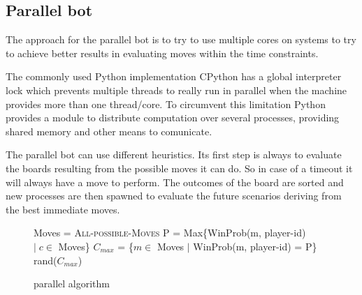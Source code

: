 \subsection{Parallel bot}
\label{parallel}

The approach for the parallel bot is to try to use multiple cores on systems to try to achieve better results in evaluating moves within the time constraints.

The commonly used Python implementation CPython has a global interpreter lock which prevents multiple threads to really run in parallel when the machine provides more than one thread/core\cite{pygil}. To circumvent this limitation Python provides a module to distribute computation over several processes, providing shared memory and other means to comunicate.

The parallel bot can use different heuristics. Its first step is always to evaluate the boards resulting from the possible moves it can do. So in case of a timeout it will always have a move to perform.
The outcomes of the board are sorted and new processes are then spawned to evaluate the future scenarios deriving from the best immediate moves.

\begin{figure}
\begin{algorithmic}
\State Moves = \textsc{All-possible-Moves}
\State P = Max\{WinProb(m, player-id) $| \; c \in$ Moves\}
\State $C_{max}$ = \{$m \in$ Moves $|$ WinProb(m, player-id) = P\}
\State \Return rand($C_{max}$)
\EndFunction
\end{algorithmic}
\caption{parallel algorithm}
\end{figure}